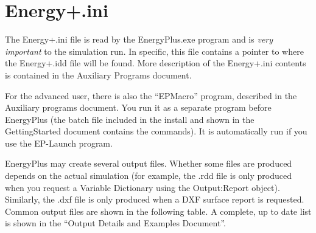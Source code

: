 \section{Energy+.ini}\label{energy.ini}

The Energy+.ini file is read by the EnergyPlus.exe program and is \emph{very important} to the simulation run. In specific, this file contains a pointer to where the Energy+.idd file will be found. More description of the Energy+.ini contents is contained in the Auxiliary Programs document.

For the advanced user, there is also the ``EPMacro'' program, described in the Auxiliary programs document. You run it as a separate program before EnergyPlus (the batch file included in the install and shown in the GettingStarted document contains the commands). It is automatically run if you use the EP-Launch program.

EnergyPlus may create several output files. Whether some files are produced depends on the actual simulation (for example, the .rdd file is only produced when you request a Variable Dictionary using the Output:Report object). Similarly, the .dxf file is only produced when a DXF surface report is requested. Common output files are shown in the following table. A complete, up to date list is shown in the ``Output Details and Examples Document''.

